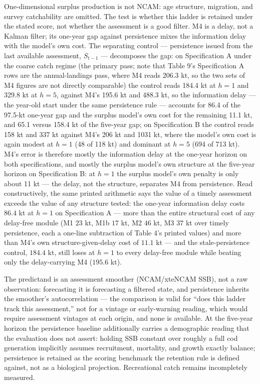 \documentclass[11pt]{article}
\begin{document}
One-dimensional surplus production is not NCAM: age structure,
migration, and survey catchability are omitted. The test is whether this
ladder is retained under the stated score, not whether the assessment is
a good filter. M4 is a delay, not a Kalman filter; its one-year gap
against persistence mixes the information delay with the model's own
cost. The separating control --- persistence issued from the last
available assessment, \(S_{t-1}\) --- decomposes the gap: on
Specification A under the coarse catch regime (the primary pass; note
that Table 9's Specification A rows are the annual-landings pass, where
M4 reads 206.3 kt, so the two sets of M4 figures are not directly
comparable) the control reads 184.4 kt at \(h = 1\) and 329.8 kt at
\(h = 5\), against M4's 195.6 kt and 488.3 kt, so the information delay
--- the year-old start under the same persistence rule --- accounts for
86.4 of the 97.5-kt one-year gap and the surplus model's own cost for
the remaining 11.1 kt, and 65.1 versus 158.4 kt of the five-year gap; on
Specification B the control reads 158 kt and 337 kt against M4's 206 kt
and 1031 kt, where the model's own cost is again modest at \(h = 1\) (48
of 118 kt) and dominant at \(h = 5\) (694 of 713 kt). M4's error is
therefore mostly the information delay at the one-year horizon on both
specifications, and mostly the surplus model's own structure at the
five-year horizon on Specification B: at \(h = 1\) the surplus model's
own penalty is only about 11 kt --- the delay, not the structure,
separates M4 from persistence. Read constructively, the same printed
arithmetic says the value of a timely assessment exceeds the value of
any structure tested: the one-year information delay costs \(86.4\) kt
at \(h = 1\) on Specification A --- more than the entire structural cost
of any delay-free module (M1 \(23\) kt, M1b \(17\) kt, M2 \(46\) kt, M3
\(37\) kt over timely persistence, each a one-line subtraction of Table
4's printed values) and more than M4's own structure-given-delay cost of
\(11.1\) kt --- and the stale-persistence control, \(184.4\) kt, still
loses at \(h = 1\) to every delay-free module while beating only the
delay-carrying M4 (\(195.6\) kt).

The predictand is an assessment smoother (NCAM/xteNCAM SSB), not a raw
observation: forecasting it is forecasting a filtered state, and
persistence inherits the smoother's autocorrelation --- the comparison
is valid for ``does this ladder track this assessment,'' not for a
vintage or early-warning reading, which would require assessment
vintages at each origin, and none is available. At the five-year horizon
the persistence baseline additionally carries a demographic reading that
the evaluation does not assert: holding SSB constant over roughly a full
cod generation implicitly assumes recruitment, mortality, and growth
exactly balance; persistence is retained as the scoring benchmark the
retention rule is defined against, not as a biological projection.
Recreational catch remains incompletely measured.
\end{document}
